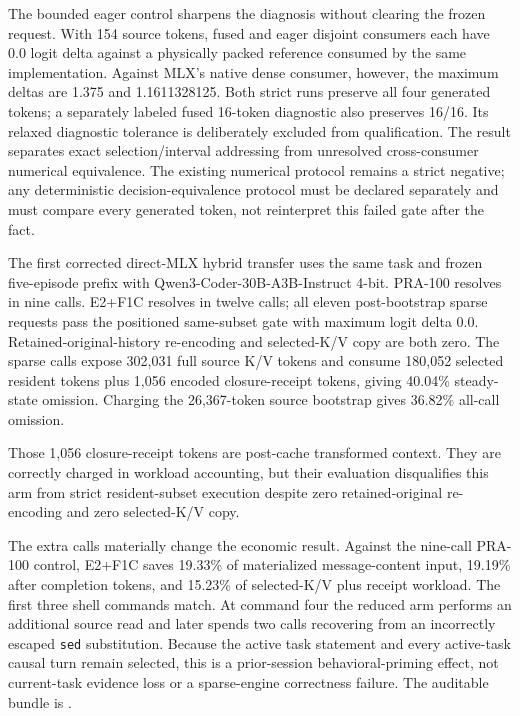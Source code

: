 \documentclass[11pt]{article}
\begin{document}
The bounded eager control sharpens the diagnosis without clearing the frozen
request.  With 154 source tokens, fused and eager disjoint consumers each have
0.0 logit delta against a physically packed reference consumed by the same
implementation.  Against MLX's native dense consumer, however, the maximum
deltas are 1.375 and 1.1611328125.  Both strict runs preserve all four
generated tokens; a separately labeled fused 16-token diagnostic also
preserves 16/16.  Its relaxed diagnostic tolerance is deliberately excluded
from qualification.  The result separates exact selection/interval addressing
from unresolved cross-consumer numerical equivalence.  The existing numerical
protocol remains a strict negative; any deterministic decision-equivalence
protocol must be declared separately and must compare every generated token,
not reinterpret this failed gate after the fact.

The first corrected direct-MLX hybrid transfer uses the same task and frozen
five-episode prefix with Qwen3-Coder-30B-A3B-Instruct 4-bit.  PRA-100 resolves
in nine calls.  E2+F1C resolves in twelve calls; all eleven post-bootstrap
sparse requests pass the positioned same-subset gate with maximum logit delta
0.0.  Retained-original-history re-encoding and selected-K/V copy are both zero.  The
sparse calls expose 302,031 full source K/V tokens and consume 180,052 selected
resident tokens plus 1,056 encoded closure-receipt tokens, giving 40.04\%
steady-state omission.  Charging the 26,367-token source bootstrap gives
36.82\% all-call omission.

Those 1,056 closure-receipt tokens are post-cache transformed context.  They
are correctly charged in workload accounting, but their evaluation disqualifies
this arm from strict resident-subset execution despite zero retained-original
re-encoding and zero selected-K/V copy.

The extra calls materially change the economic result.  Against the nine-call
PRA-100 control, E2+F1C saves 19.33\% of materialized message-content input,
19.19\% after completion tokens, and 15.23\% of selected-K/V plus receipt
workload.  The first three shell commands match.  At command four the reduced
arm performs an additional source read and later spends two calls recovering
from an incorrectly escaped \texttt{sed} substitution.  Because the active
task statement and every active-task causal turn remain selected, this is a
prior-session behavioral-priming effect, not current-task evidence loss or a
sparse-engine correctness failure.  The auditable bundle is
.
\end{document}
